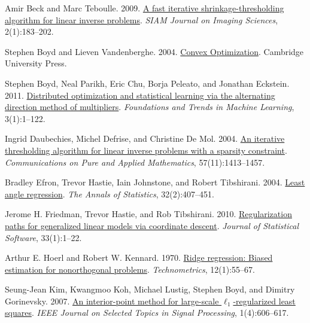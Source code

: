 \begingroup\small
\begin{thebibliography}{}
\setlength{\itemsep}{1pt}\setlength{\parskip}{0pt}
Amir Beck and Marc Teboulle. 2009.
\href{https://doi.org/10.1137/080716542}{A fast iterative shrinkage-thresholding algorithm for linear inverse problems}.
\emph{SIAM Journal on Imaging Sciences}, 2(1):183--202.

Stephen Boyd and Lieven Vandenberghe. 2004.
\href{https://web.stanford.edu/~boyd/cvxbook/}{Convex Optimization}.
Cambridge University Press.

Stephen Boyd, Neal Parikh, Eric Chu, Borja Peleato, and Jonathan Eckstein. 2011.
\href{https://doi.org/10.1561/2200000016}{Distributed optimization and statistical learning via the alternating direction method of multipliers}.
\emph{Foundations and Trends in Machine Learning}, 3(1):1--122.

Ingrid Daubechies, Michel Defrise, and Christine De Mol. 2004.
\href{https://doi.org/10.1002/cpa.20042}{An iterative thresholding algorithm for linear inverse problems with a sparsity constraint}.
\emph{Communications on Pure and Applied Mathematics}, 57(11):1413--1457.

Bradley Efron, Trevor Hastie, Iain Johnstone, and Robert Tibshirani. 2004.
\href{https://doi.org/10.1214/009053604000000067}{Least angle regression}.
\emph{The Annals of Statistics}, 32(2):407--451.

Jerome H. Friedman, Trevor Hastie, and Rob Tibshirani. 2010.
\href{https://doi.org/10.18637/jss.v033.i01}{Regularization paths for generalized linear models via coordinate descent}.
\emph{Journal of Statistical Software}, 33(1):1--22.

Arthur E. Hoerl and Robert W. Kennard. 1970.
\href{https://doi.org/10.1080/00401706.1970.10488634}{Ridge regression: Biased estimation for nonorthogonal problems}.
\emph{Technometrics}, 12(1):55--67.

Seung-Jean Kim, Kwangmoo Koh, Michael Lustig, Stephen Boyd, and Dimitry Gorinevsky. 2007.
\href{https://doi.org/10.1109/JSTSP.2007.910971}{An interior-point method for large-scale $\ell_1$-regularized least squares}.
\emph{IEEE Journal on Selected Topics in Signal Processing}, 1(4):606--617.


\end{thebibliography}
